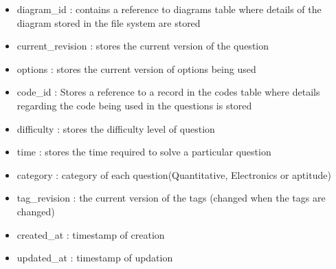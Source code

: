 \documentclass[a4paper,12pt,oneside]{book}
\begin{document}
\begin{enumerate}
\begin{itemize}
                  \item diagram\_id : contains a reference to diagrams table where details of the diagram stored in the file system are stored
                  
                  \item current\_revision : stores the current version of the question
                  
                  \item options : stores the current version of options being used
                  
                  \item code\_id : Stores a reference to a record in the codes table where details regarding the code being used in the questions is stored 
                  
                  \item difficulty : stores the difficulty level of question 
                  
                  \item time : stores the time required to solve a particular question 
                  
                  \item category : category of each question(Quantitative, Electronics or aptitude)
                  
                  \item tag\_revision : the current version of the tags (changed when the tags are changed)
                  
                  \item created\_at : timestamp of creation
                  
                  \item updated\_at : timestamp of updation 
                \end{itemize}
        \end{enumerate}
        
\end{document}
